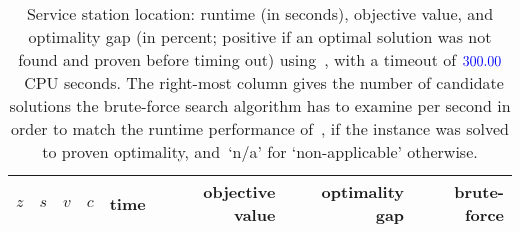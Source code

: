 \begin{table}[t]  %
  \centering
  \begin{tabular}{rrrrrrrr}  %
    $z$ & $s$ & $v$ & $c$ & time & objective value & optimality gap & brute-force \\
    \midrule
  \end{tabular}
  \caption{Service station location: runtime (in seconds), objective
    value, and optimality gap (in percent; positive if an optimal
    solution was not found and proven before timing out)
    using~\SolverMIP, with a timeout of ${\color{blue}300.00}$~CPU seconds.
    The right-most column gives the number of candidate solutions the
    brute-force search algorithm has to examine per second in order to
    match the runtime performance of~\SolverMIP, if the instance was
    solved to proven optimality, and~`n/a' for `non-applicable'
    otherwise.
  }
  \label{tab:res:mip}
\end{table}

